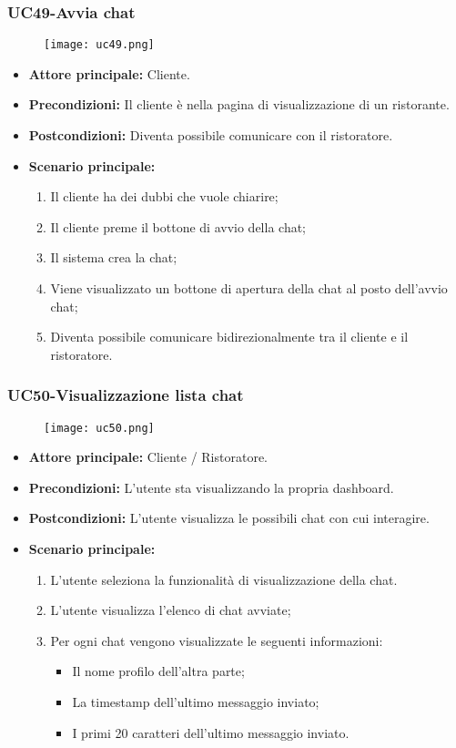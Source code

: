 \pagebreak
\subsubsection{UC49-Avvia chat}
\begin{figure}[h] \texttt{[image: uc49.png]} \end{figure}
\begin{itemize}
\item \textbf{Attore principale:} Cliente.
\item \textbf{Precondizioni:} Il cliente è nella pagina di visualizzazione di un ristorante.
\item \textbf{Postcondizioni:} Diventa possibile comunicare con il ristoratore.
\item \textbf{Scenario principale:}
\begin{enumerate}
    \item Il cliente ha dei dubbi che vuole chiarire;
    \item Il cliente preme il bottone di avvio della chat;
    \item Il sistema crea la chat;
    \item Viene visualizzato un bottone di apertura della chat al posto dell'avvio chat;
    \item Diventa possibile comunicare bidirezionalmente tra il cliente e il ristoratore.
\end{enumerate}
\end{itemize}

\subsubsection{UC50-Visualizzazione lista chat}
\begin{figure}[h] \texttt{[image: uc50.png]} \end{figure}
\begin{itemize}
\item \textbf{Attore principale:} Cliente / Ristoratore.
\item \textbf{Precondizioni:} L'utente sta visualizzando la propria dashboard.
\item \textbf{Postcondizioni:} L'utente visualizza le possibili chat con cui interagire.
\item \textbf{Scenario principale:}
\begin{enumerate}
    \item L'utente seleziona la funzionalità di visualizzazione della chat.
    \item L'utente visualizza l'elenco di chat avviate;
    \item Per ogni chat vengono visualizzate le seguenti informazioni:
      \begin{itemize}
        \item Il nome profilo dell'altra parte;
        \item La timestamp dell'ultimo messaggio inviato;
        \item I primi 20 caratteri dell'ultimo messaggio inviato.
      \end{itemize}
\end{enumerate}
\end{itemize}


